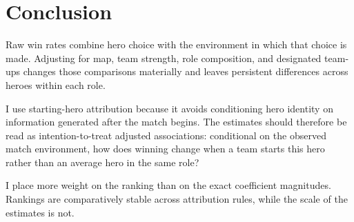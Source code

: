 \documentclass[11pt]{article}
\begin{document}
\FloatBarrier
\section*{Conclusion}

Raw win rates combine hero choice with the environment in which that choice is made. Adjusting
for map, team strength, role composition, and designated team-ups changes those comparisons
materially and leaves persistent differences across heroes within each role.

I use starting-hero attribution because it avoids conditioning hero identity on information
generated after the match begins. The estimates should therefore be read as intention-to-treat
adjusted associations: conditional on the observed match environment, how does winning change
when a team starts this hero rather than an average hero in the same role?

I place more weight on the ranking than on the exact coefficient magnitudes. Rankings are
comparatively stable across attribution rules, while the scale of the estimates is not.
\end{document}
